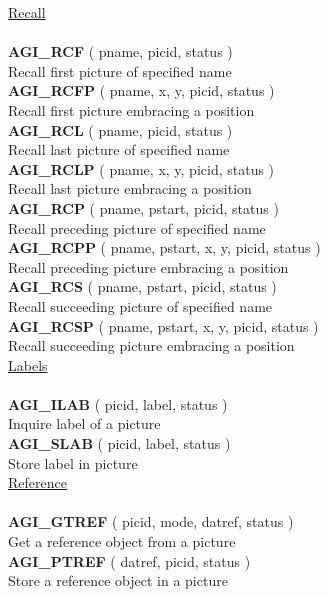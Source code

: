 \begin{tabbing}
\underline{Recall}\\ \\
{\bf AGI\_RCF}   \> ( pname, picid, status )\\
                 \> Recall first picture of specified name\\[1ex]
{\bf AGI\_RCFP}  \> ( pname, x, y, picid, status )\\
                 \> Recall first picture embracing a position\\[1ex]
{\bf AGI\_RCL}   \> ( pname, picid, status )\\
                 \> Recall last picture of specified name\\[1ex]
{\bf AGI\_RCLP}  \> ( pname, x, y, picid, status )\\
                 \> Recall last picture embracing a position\\[1ex]
{\bf AGI\_RCP}   \> ( pname, pstart, picid, status )\\
                 \> Recall preceding picture of specified name\\[1ex]
{\bf AGI\_RCPP}  \> ( pname, pstart, x, y, picid, status )\\
                 \> Recall preceding picture embracing a position\\[1ex]
{\bf AGI\_RCS}   \> ( pname, pstart, picid, status )\\
                 \> Recall succeeding picture of specified name\\[1ex]
{\bf AGI\_RCSP}  \> ( pname, pstart, x, y, picid, status )\\
                 \> Recall succeeding picture embracing a position\\[2ex]

\underline{Labels}\\ \\
{\bf AGI\_ILAB}  \> ( picid, label, status )\\
                 \> Inquire label of a picture\\[1ex]
{\bf AGI\_SLAB}  \> ( picid, label, status )\\
                 \> Store label in picture\\[2ex]

\underline{Reference}\\ \\
{\bf AGI\_GTREF} \> ( picid, mode, datref, status )\\
                 \> Get a reference object from a picture\\[1ex]
{\bf AGI\_PTREF} \> ( datref, picid, status )\\
                 \> Store a reference object in a picture\\[2ex]


\end{tabbing}
